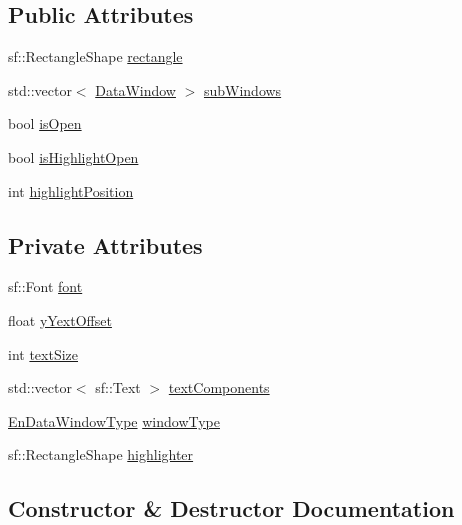 \subsection*{Public Attributes}
\begin{DoxyCompactItemize}
\item 
sf\+::\+Rectangle\+Shape \mbox{\hyperlink{class_data_window_aebb341b8967c4d5a0737f11dba2906ee}{rectangle}}
\item 
std\+::vector$<$ \mbox{\hyperlink{class_data_window}{Data\+Window}} $>$ \mbox{\hyperlink{class_data_window_a42f40a697faf1e7e312d7d364a73c407}{sub\+Windows}}
\item 
bool \mbox{\hyperlink{class_data_window_a90f2baaa114333dd06f3ef4c19ee8f03}{is\+Open}}
\item 
bool \mbox{\hyperlink{class_data_window_ae2a48d16f580f227d72fac30671c18e2}{is\+Highlight\+Open}}
\item 
int \mbox{\hyperlink{class_data_window_a173752ec4ab4b5516e182482244847fa}{highlight\+Position}}
\end{DoxyCompactItemize}
\subsection*{Private Attributes}
\begin{DoxyCompactItemize}
\item 
sf\+::\+Font \mbox{\hyperlink{class_data_window_a7c7064e5c2cef5bd663dd1d6b304a59f}{font}}
\item 
float \mbox{\hyperlink{class_data_window_a6cd46170662797b4c05558b524606de3}{y\+Yext\+Offset}}
\item 
int \mbox{\hyperlink{class_data_window_a318abc91565470aa7af9cf64e6fa5710}{text\+Size}}
\item 
std\+::vector$<$ sf\+::\+Text $>$ \mbox{\hyperlink{class_data_window_a30343d4a1839ed79689076a215f49625}{text\+Components}}
\item 
\mbox{\hyperlink{_data_window_8hpp_a3c1e0c6fe947fdbea7502497b27cf44d}{En\+Data\+Window\+Type}} \mbox{\hyperlink{class_data_window_a0ace2dac637e9483b554814128994dc7}{window\+Type}}
\item 
sf\+::\+Rectangle\+Shape \mbox{\hyperlink{class_data_window_a9327ec35861506709cea0f001f95cb9b}{highlighter}}
\end{DoxyCompactItemize}


\subsection{Constructor \& Destructor Documentation}
\mbox{\label{class_data_window_a4a42f108e200e907b98a36e28821d97d}} 

